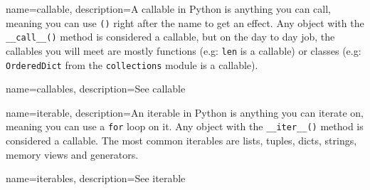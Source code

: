 \makeglossaries

{
    name=callable,
    description={A callable in Python is anything you can call, meaning you can use \lstinline{()} right after the name to get an effect. Any object with the \lstinline{__call__()} method is considered a callable, but on the day to day job, the callables you will meet are mostly functions (e.g: \lstinline{len} is a callable) or classes (e.g: \lstinline{OrderedDict} from the \lstinline{collections} module is a callable).}
}

{
    name=callables,
    description={See callable}
}

{
    name=iterable,
    description={An iterable in Python is anything you can iterate on, meaning you can use a \lstinline{for} loop on it. Any object with the \lstinline{__iter__()} method is considered a callable. The most common iterables are lists, tuples, dicts, strings, memory views and generators.}
}

{
    name=iterables,
    description={See iterable}
}
